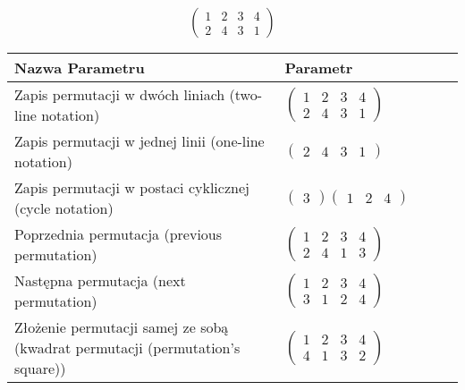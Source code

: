 \documentclass[12pt]{article}
\begin{document}
\subsection{}
\begin{center}
\[
\begin{pmatrix}
	1 & 2 & 3 & 4 \\ 
	2 & 4 & 3 & 1 
\end{pmatrix}
\]

\begin{tabular}{|m{0.6\linewidth}|m{0.4\linewidth}|}
	\hline
	Nazwa Parametru & Parametr \\
	\hline
	Zapis permutacji w dwóch liniach (two-line notation) & $\begin{pmatrix} 1 & 2 & 3 & 4 \\ 
2 & 4 & 3 & 1 \end{pmatrix}$ \\ 
	\hline
	Zapis permutacji w jednej linii (one-line notation) & $\begin{pmatrix} 2 & 4 & 3 & 1 \end{pmatrix}$ \\ 
	\hline
	Zapis permutacji w postaci cyklicznej (cycle notation) & $\begin{pmatrix} 3 \end{pmatrix} \begin{pmatrix} 1 & 2 & 4 \end{pmatrix} $ \\ 
	\hline
	Poprzednia permutacja (previous permutation) & $\begin{pmatrix} 1 & 2 & 3 & 4 \\ 
2 & 4 & 1 & 3 \end{pmatrix}$ \\ 
	\hline
	Następna permutacja (next permutation) & $\begin{pmatrix} 1 & 2 & 3 & 4 \\ 
3 & 1 & 2 & 4 \end{pmatrix}$ \\ 
	\hline
	Złożenie permutacji samej ze sobą (kwadrat permutacji (permutation's square)) & $\begin{pmatrix} 1 & 2 & 3 & 4 \\ 
4 & 1 & 3 & 2 \end{pmatrix}$ \\ 
	\hline
\end{tabular}
\end{center}
\end{document}
